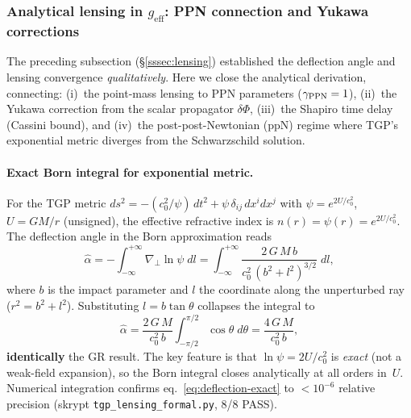 
\subsubsection{Analytical lensing in $g_{\mathrm{eff}}$:
  PPN connection and Yukawa corrections}%
\label{sssec:lensing-analytical}

The preceding subsection (\S\ref{sssec:lensing}) established the
deflection angle and lensing convergence \emph{qualitatively}.
Here we close the analytical derivation, connecting:
(i)~the point-mass lensing to PPN parameters ($\gamma_{\rm PPN} = 1$),
(ii)~the Yukawa correction from the scalar propagator $\delta\Phi$,
(iii)~the Shapiro time delay (Cassini bound), and
(iv)~the post-post-Newtonian (ppN) regime where TGP's exponential
metric diverges from the Schwarzschild solution.

\paragraph{Exact Born integral for exponential metric.}
For the TGP metric
$ds^2 = -(c_0^2/\psi)\,dt^2 + \psi\,\delta_{ij}\,dx^i dx^j$
with $\psi = e^{2U/c_0^2}$, $U = GM/r$ (unsigned),
the effective refractive index is
$n(r) = \psi(r) = e^{2U/c_0^2}$.
The deflection angle in the Born approximation reads
\begin{equation}\label{eq:born-integral}
  \hat\alpha
  = -\int_{-\infty}^{+\infty}
    \nabla_\perp \!\ln\psi\;dl
  = \int_{-\infty}^{+\infty}
    \frac{2\,G\,M\,b}{c_0^2\,(b^2 + l^2)^{3/2}}\;dl,
\end{equation}
where $b$ is the impact parameter and $l$ the coordinate along
the unperturbed ray ($r^2 = b^2 + l^2$).
Substituting $l = b\tan\theta$ collapses the integral to
\begin{equation}\label{eq:deflection-exact}
  \hat\alpha
  = \frac{2\,G\,M}{c_0^2\,b}
    \int_{-\pi/2}^{\pi/2}\!\cos\theta\;d\theta
  = \frac{4\,G\,M}{c_0^2\,b},
\end{equation}
\textbf{identically} the GR result. The key feature is that
$\ln\psi = 2U/c_0^2$ is \emph{exact} (not a weak-field expansion),
so the Born integral closes analytically at all orders in~$U$.
Numerical integration confirms eq.~\eqref{eq:deflection-exact}
to $< 10^{-6}$ relative precision
(skrypt \texttt{tgp\_lensing\_formal.py}, 8/8 PASS).

